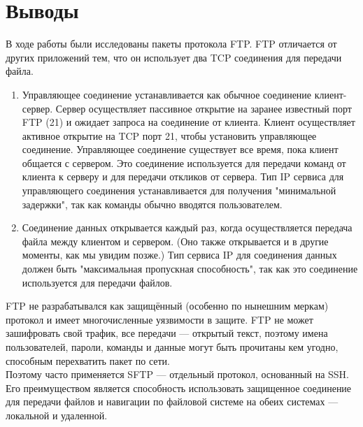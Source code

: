 \documentclass[a4paper, 14pt,russian]{article}
\begin{document}
\section{Выводы}
В ходе работы были исследованы пакеты протокола FTP. 
FTP отличается от других приложений тем, что он использует два TCP соединения для передачи файла.



\begin{enumerate}
	\item Управляющее соединение устанавливается как обычное соединение клиент-сервер. Сервер осуществляет пассивное открытие на заранее известный порт FTP (21) и ожидает запроса на соединение от клиента. Клиент осуществляет активное открытие на TCP порт 21, чтобы установить управляющее соединение. Управляющее соединение существует все время, пока клиент общается с сервером. Это соединение используется для передачи команд от клиента к серверу и для передачи откликов от сервера. Тип IP сервиса для управляющего соединения устанавливается для получения "минимальной задержки", так как команды обычно вводятся пользователем.
	\item Соединение данных открывается каждый раз, когда осуществляется передача файла между клиентом и сервером. (Оно также открывается и в другие моменты, как мы увидим позже.) Тип сервиса IP для соединения данных должен быть "максимальная пропускная способность", так как это соединение используется для передачи файлов.
\end{enumerate}


FTP не разрабатывался как защищённый (особенно по нынешним меркам) протокол и имеет многочисленные уязвимости в защите. FTP не может зашифровать свой трафик, все передачи — открытый текст, поэтому имена пользователей, пароли, команды и данные могут быть прочитаны кем угодно, способным перехватить пакет по сети.\\
Поэтому часто применяется SFTP — отдельный протокол, основанный на SSH. Его преимуществом является способность использовать защищенное соединение для передачи файлов и навигации по файловой системе на обеих системах — локальной и удаленной.

\end{document}
